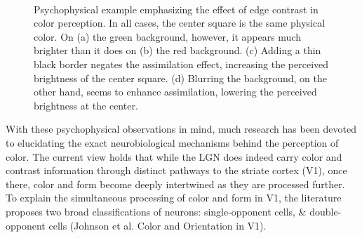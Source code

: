 \documentclass[journal,onecolumn]{IEEEtran}
\begin{document}
\begin{figure}[H]
    \centering
    ~
    ~
    ~
    \caption{Psychophysical example emphasizing the effect of edge contrast in color perception. In all cases, the center square is the same physical color. On (a) the green background, however, it appears much brighter than it does on (b) the red background. (c) Adding a thin black border negates the assimilation effect, increasing the perceived brightness of the center square. (d) Blurring the background, on the other hand, seems to enhance assimilation, lowering the perceived brightness at the center.}
    \label{fig:blur-effect}
\end{figure}

With these psychophysical observations in mind, much research has been devoted to elucidating the exact neurobiological mechanisms behind the perception of color. The current view holds that while the LGN does indeed carry color and contrast information through distinct pathways to the striate cortex (V1), once there, color and form become deeply intertwined as they are processed further. To explain the simultaneous processing of color and form in V1, the literature proposes two broad classifications of neurons: single-opponent cells, \& double-opponent cells (Johnson et al. Color and Orientation in V1).
\end{document}
